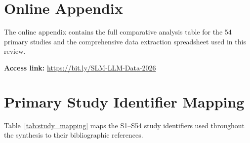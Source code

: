 \section{Online Appendix}
\label{app:online_appendix}

The online appendix contains the full comparative analysis table for the 54 primary studies and the comprehensive data extraction spreadsheet used in this review.

\noindent\textbf{Access link:} \url{https://bit.ly/SLM-LLM-Data-2026}

\section{Primary Study Identifier Mapping}
\label{app:study_mapping}

Table~\ref{tab:study_mapping} maps the S1--S54 study identifiers used throughout the synthesis to their bibliographic references.

